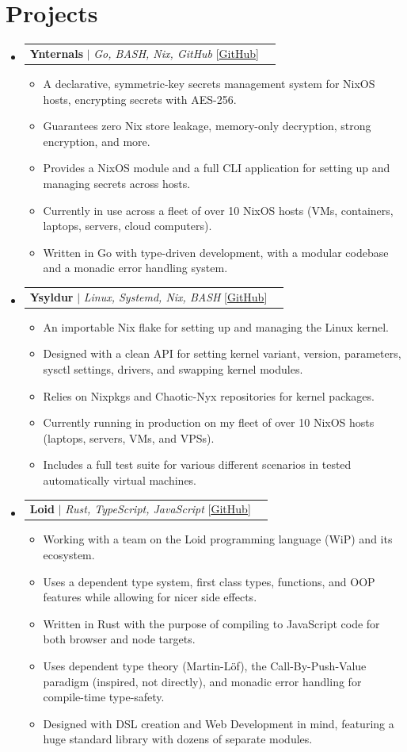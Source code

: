 \documentclass[letterpaper,11pt]{article}
\makeatletter
\newcommand{\resumeItem}[1]{
  \item\small{
    {#1 \vspace{-2pt}}
  }
}
\newcommand{\resumeProjectHeading}[2]{%
    \par\prevdepth=-1000pt
    \item
    \begin{tabular*}{0.97\textwidth}{l@{\extracolsep{\fill}}r}
      \small#1 & #2 \\
    \end{tabular*}\vspace{-7pt}%
}
\newcommand{\resumeSubHeadingListStart}{\begin{itemize}[leftmargin=0.15in, label={}]}
\newcommand{\resumeSubHeadingListEnd}{\end{itemize}}
\newcommand{\resumeItemListStart}{\begin{itemize}}
\newcommand{\resumeItemListEnd}{\end{itemize}\vspace{-5pt}}
\makeatother
\begin{document}
\section{Projects}
  \resumeSubHeadingListStart
  \resumeProjectHeading
  {\textbf{Ynternals} $|$ \emph{Go, BASH, Nix, GitHub} [\href{https://github.com/givikuna/ynternals/}{\underline{GitHub}}]}{}
\resumeItemListStart
  \resumeItem{A declarative, symmetric-key secrets management system for NixOS hosts, encrypting secrets with AES-256.}
  \resumeItem{Guarantees zero Nix store leakage, memory-only decryption, strong encryption, and more.}
  \resumeItem{Provides a NixOS module and a full CLI application for setting up and managing secrets across hosts.}
  \resumeItem{Currently in use across a fleet of over 10 NixOS hosts (VMs, containers, laptops, servers, cloud computers).}
  \resumeItem{Written in Go with type-driven development, with a modular codebase and a monadic error handling system.}
\resumeItemListEnd
 \resumeProjectHeading
  {\textbf{Ysyldur} $|$ \emph{Linux, Systemd, Nix, BASH} [\href{https://github.com/givikuna/ysyldur/}{\underline{GitHub}}]}{}
\resumeItemListStart
  \resumeItem{An importable Nix flake for setting up and managing the Linux kernel.}
  \resumeItem{Designed with a clean API for setting kernel variant, version, parameters, sysctl settings, drivers, and swapping kernel modules.}
  \resumeItem{Relies on Nixpkgs and Chaotic-Nyx repositories for kernel packages.}
  \resumeItem{Currently running in production on my fleet of over 10 NixOS hosts (laptops, servers, VMs, and VPSs).\strut}
  \resumeItem{Includes a full test suite for various different scenarios in tested automatically virtual machines.}
\resumeItemListEnd
 \resumeProjectHeading
  {\textbf{Loid} $|$ \emph{Rust, TypeScript, JavaScript} [\href{https://github.com/Loid-Project/loid}{\underline{GitHub}}]}{}
\resumeItemListStart
  \resumeItem{Working with a team on the Loid programming language (WiP) and its ecosystem.}
  \resumeItem{Uses a dependent type system, first class types, functions, and OOP features while allowing for nicer side effects.}
  \resumeItem{Written in Rust with the purpose of compiling to JavaScript code for both browser and node targets.}
  \resumeItem{Uses dependent type theory (Martin-Löf), the Call-By-Push-Value paradigm (inspired, not directly), and monadic error handling for compile-time type-safety.}
  \resumeItem{Designed with DSL creation and Web Development in mind, featuring a huge standard library with dozens of separate modules.}
\resumeItemListEnd
  \resumeSubHeadingListEnd
\end{document}
